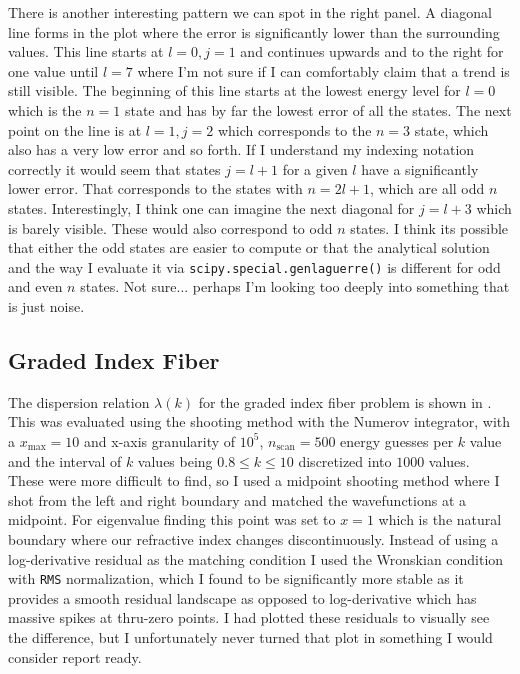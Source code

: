 \documentclass[10pt, titlepage, a4paper]{article}
\begin{document}
There is another interesting pattern we can spot in the right panel. A diagonal line forms in the plot where the error is significantly lower than the surrounding values. 
This line starts at $l=0, j=1$ and continues upwards and to the right for one value until $l=7$ where I'm not sure if I can comfortably claim that a trend is still visible.
The beginning of this line starts at the lowest energy level for $l=0$ which is the $n=1$ state and has by far the lowest error of all the states. The next point on the line is at $l=1, j=2$ which corresponds to the $n=3$ state,
which also has a very low error and so forth. If I understand my indexing notation correctly it would seem that states $j = l+1$ for a given $l$ have a significantly lower error. That corresponds to the states with $n = 2l + 1$,
which are all odd $n$ states. Interestingly, I think one can imagine the next diagonal for $j = l + 3$ which is barely visible. These would also correspond to odd $n$ states. I think its possible that either the odd states are easier to compute 
or that the analytical solution and the way I evaluate it via \texttt{scipy.special.genlaguerre()} is different for odd and even $n$ states. Not sure... perhaps I'm looking too deeply into something 
that is just noise.

\subsection{Graded Index Fiber}
The dispersion relation $\lambda(k)$ for the graded index fiber problem is shown in . This was evaluated using the shooting method with the Numerov integrator, 
with a $x_{\text{max}} = 10$ and x-axis granularity of $10^5$, $n_{\text{scan}} = 500$ energy guesses per $k$ value and the interval of $k$ values being $0.8 \leq k \leq 10$ discretized into $1000$ values. \\

These were more difficult to find, so I used a midpoint shooting method where I shot from the left and right boundary and matched the wavefunctions at a midpoint. For eigenvalue finding 
this point was set to $x = 1$ which is the natural boundary where our refractive index changes discontinuously. Instead of using a log-derivative residual as the matching condition 
I used the Wronskian condition with \texttt{RMS} normalization, which I found to be significantly more stable as it provides a smooth residual landscape as opposed to log-derivative which has massive spikes 
at thru-zero points. I had plotted these residuals to visually see the difference, but I unfortunately never turned that plot in something I would consider report ready. 
\end{document}
